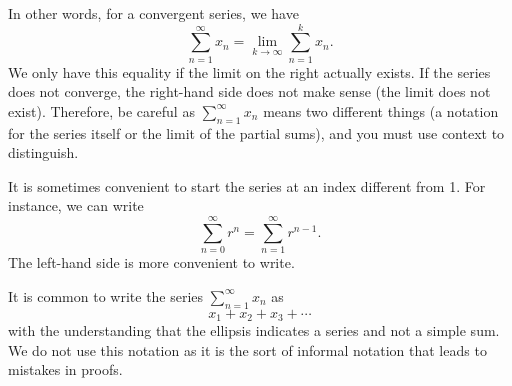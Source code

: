 In other words, for a convergent series, we have
\begin{equation*}
\sum_{n=1}^\infty x_n
=
\lim_{k\to\infty} 
\sum_{n=1}^k x_n .
\end{equation*}
We only have this equality if the limit on
the right actually exists.  If the series does not converge, the right-hand
side does not make sense (the limit does not exist).
Therefore, be careful as 
$\sum_{n=1}^\infty x_n$ means two different things (a notation for the series itself 
or the limit of the partial sums), and you must use context
to distinguish.

\begin{remark}
It is sometimes convenient to start
the series at an index different from 1.  For instance, we can write
\begin{equation*}
\sum_{n=0}^\infty r^n = \sum_{n=1}^\infty r^{n-1} .
\end{equation*}
The left-hand side is more convenient to write.
\end{remark}

\begin{remark}
It is common to write the series $\sum_{n=1}^\infty x_n$ as
\begin{equation*}
x_1 + x_2 + x_3 + \cdots
\end{equation*}
with the understanding that the ellipsis indicates a series and
not a simple sum.  We do not use this notation as it is the sort of informal
notation that leads to mistakes in proofs.
\end{remark}

